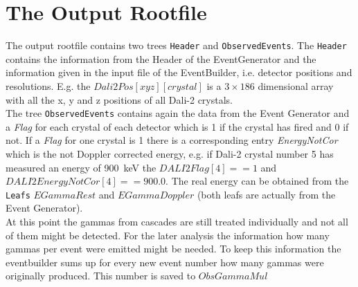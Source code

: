 \documentclass[12pt]{book}
\begin{document}



\section{The Output Rootfile}\label{chap:builderOutputFile}

The output rootfile contains two trees \texttt{Header} and \texttt{ObservedEvents}. The \texttt{Header} contains the information from the Header of the EventGenerator and the information given in the input file of the EventBuilder, i.e. detector positions and resolutions. E.g. the $Dali2Pos[xyz][crystal]$ is a $3\times186$ dimensional array with all the x, y and z positions of all Dali-2 crystals.\\
The tree \texttt{ObservedEvents} contains again the data from the Event Generator and a \textit{Flag} for each crystal of each detector which is 1 if the crystal has fired and 0 if not. If a \textit{Flag} for one crystal is 1 there is a corresponding entry \textit{EnergyNotCor} which is the not Doppler corrected energy, e.g. if Dali-2 crystal number 5 has measured an energy of 900~keV the $DALI2Flag[4]==1$ and $DALI2EnergyNotCor[4]==900.0$. The real energy can be obtained from the \texttt{Leafs} $EGammaRest$ and $EGammaDoppler$ (both leafs are actually from the Event Generator).\\
At this point the gammas from cascades are still treated individually and not all of them might be detected. For the later analysis the information how many gammas per event were emitted might be needed. To keep this information the eventbuilder sums up for every new event number how many gammas were originally produced. This number is saved to $ObsGammaMul$ %
\end{document}
